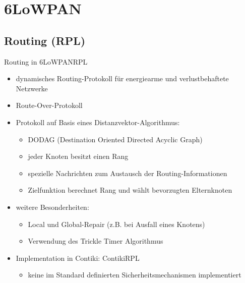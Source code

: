 \section{6LoWPAN}

\subsection{Routing (RPL)}

\begin{frame}{Routing in 6LoWPAN}{RPL}
		\begin{block}{}
			\begin{itemize}
			\item 	dynamisches Routing-Protokoll
					für energiearme und verlustbehaftete Netzwerke
			\item 	Route-Over-Protokoll
			\item 	Protokoll auf Basis eines Distanzvektor-Algorithmus:
					\begin{itemize}
					\item 	DODAG (Destination Oriented Directed Acyclic Graph)
					\item 	jeder Knoten besitzt einen Rang
					\item 	spezielle Nachrichten zum Austausch der
							Routing-Informationen 
					\item 	Zielfunktion berechnet Rang
							und wählt bevorzugten Elternknoten
					\end{itemize}
			\item 	weitere Besonderheiten:
					\begin{itemize}
					\item 	Local und Global-Repair (z.B. bei Ausfall eines Knotens)
					\item 	Verwendung des Trickle Timer Algorithmus
					\end{itemize}
			\item 	Implementation in Contiki: ContikiRPL
					\begin{itemize}
					\item 	keine im Standard definierten Sicherheitsmechanismen implementiert
					\end{itemize}
			\end{itemize}
		\end{block}
\end{frame}

